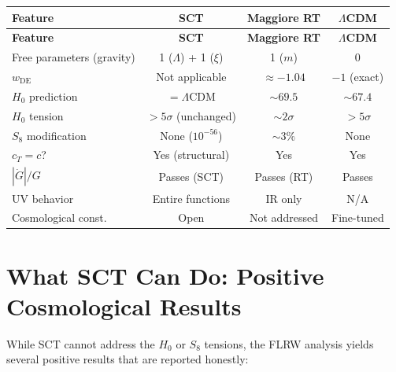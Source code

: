\documentclass[11pt,a4paper]{article}
\theoremstyle{plain}
\theoremstyle{definition}
\theoremstyle{remark}
\begin{document}
\begin{longtable}{p{3.5cm}ccc}
\toprule
\textbf{Feature} & \textbf{SCT} & \textbf{Maggiore RT} & \textbf{$\Lambda$CDM} \\
\midrule
\endfirsthead
\toprule
\textbf{Feature} & \textbf{SCT} & \textbf{Maggiore RT} & \textbf{$\Lambda$CDM} \\
\midrule
\endhead
Free parameters (gravity) & 1 ($\Lambda$) + 1 ($\xi$) & 1 ($m$) & 0 \\
$w_{\mathrm{DE}}$ & Not applicable & $\approx -1.04$ & $-1$ (exact) \\
$H_0$ prediction & $= \Lambda$CDM & $\sim 69.5$ & $\sim 67.4$ \\
$H_0$ tension & $>5\sigma$ (unchanged) & $\sim 2\sigma$ & $>5\sigma$ \\
$S_8$ modification & None ($10^{-56}$) & $\sim 3\%$ & None \\
$c_T = c$? & Yes (structural) & Yes & Yes \\
$|\dot{G}|/G$ & Passes (SCT) & Passes (RT) & Passes \\
UV behavior & Entire functions & IR only & N/A \\
Cosmological const. & Open & Not addressed & Fine-tuned \\
\bottomrule
\end{longtable}

\section{What SCT Can Do: Positive Cosmological Results}
\label{sec:positive}

While SCT cannot address the $H_0$ or $S_8$ tensions, the FLRW
analysis yields several positive results that are reported honestly:
\end{document}
